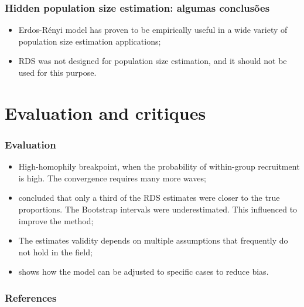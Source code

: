 \documentclass{beamer}
\begin{document}
\begin{frame}
  \frametitle{Hidden population size estimation: algumas conclusões}

  \begin{itemize}
    \justifying
    
    \item Erdos-Rényi model has proven to be empirically useful in a wide
    variety of population size estimation applications; 

    \item RDS was not designed for population size estimation, and it should not be used for this purpose.
    
  \end{itemize}

\end{frame}

\section{Evaluation and critiques}

\begin{frame}
  \frametitle{Evaluation}

  \begin{itemize}
    \justifying

  \item \cite{goel2009respondent} High-homophily breakpoint, when the
  probability of within-group recruitment is high. The convergence requires
  many more waves; 

  \item \cite{mccreesh2012evaluation} concluded that only a third of the RDS
  estimates were closer to the true proportions. The Bootstrap intervals were
  underestimated. This influenced \cite{baraff2016estimating} to improve the
  method;

  \item The estimates validity depends on multiple assumptions that frequently do not hold in the field;
  
  \item \cite{shi2019model} shows how the model can be adjusted to specific
  cases to reduce bias. 
  \end{itemize}

\end{frame}

\begin{frame}[t, allowframebreaks]
   \frametitle{References}
   
   
 \end{frame}
\end{document}
